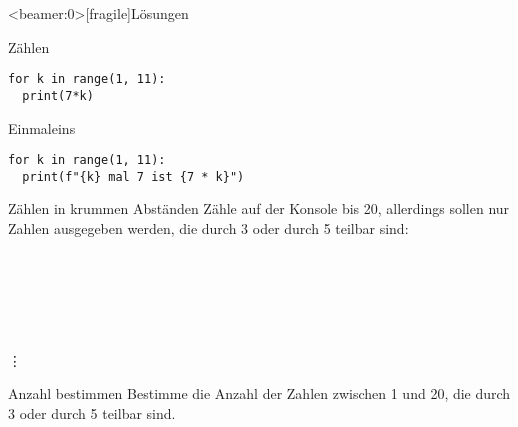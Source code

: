 \begin{frame}<beamer:0>[fragile]{Lösungen}


\begin{solutionblock}{Zählen}
\begin{verbatim}
for k in range(1, 11):
  print(7*k)
\end{verbatim}
\end{solutionblock}

\vspace{12pt}

\begin{solutionblock}{Einmaleins}
\begin{verbatim}
for k in range(1, 11):
  print(f"{k} mal 7 ist {7 * k}")
\end{verbatim}
\end{solutionblock}

\end{frame}

\begin{fragile}

\begin{block}{Zählen in krummen Abständen}	
\vspace{2pt}
Zähle auf der Konsole bis 20, allerdings sollen nur Zahlen ausgegeben werden, die durch 3 oder durch 5 teilbar sind:

 \\
 \\
 \\
 \\
\\
\phantom{|}\vdots\\
\end{block}

\vspace{12pt}
\pause

\begin{block}{Anzahl bestimmen}
\vspace{2pt}
Bestimme die Anzahl der Zahlen zwischen 1 und 20, die durch 3 oder durch 5 teilbar sind. 
\end{block}
\end{fragile}

